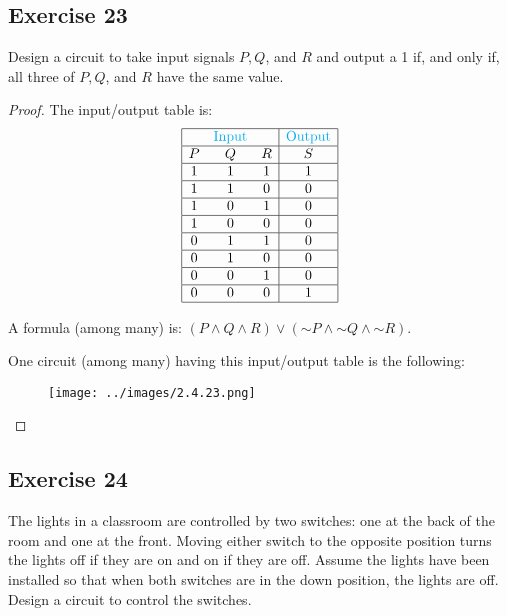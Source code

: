 \documentclass[14pt]{extarticle}
\begin{document}
\subsection{Exercise 23}
Design a circuit to take input signals $P, Q$, and $R$ and output a 1 if, and only if, all three of $P, Q$, and $R$ have the same value.

\begin{proof}
    The input/output table is:
    $$
        \begin{array}{|ccc|c|}
            \hline
              & \color{cyan}\text{Input} &   & \color{cyan}\text{Output} \\ \hline
            P & Q                        & R & S                         \\
            \hline
            1 & 1                        & 1 & 1                         \\
            \hline
            1 & 1                        & 0 & 0                         \\
            \hline
            1 & 0                        & 1 & 0                         \\
            \hline
            1 & 0                        & 0 & 0                         \\
            \hline
            0 & 1                        & 1 & 0                         \\
            \hline
            0 & 1                        & 0 & 0                         \\
            \hline
            0 & 0                        & 1 & 0                         \\
            \hline
            0 & 0                        & 0 & 1                         \\
            \hline
        \end{array}
    $$

    A formula (among many) is: $(P \wedge Q \wedge R) \vee ({\sim P} \wedge {\sim Q} \wedge {\sim R})$.

    One circuit (among many) having this input/output table is the following:
    \begin{figure}[ht!]
        \centering
        \texttt{[image: ../images/2.4.23.png]}
    \end{figure}
\end{proof}

\subsection{Exercise 24}
The lights in a classroom are controlled by two switches: one at the back of the room and one at the front. Moving either switch to the opposite position turns the lights off if they are on and on if they are off. Assume the lights have been installed so that when both switches are in the down position, the lights are off. Design a circuit to control the switches.
\end{document}
